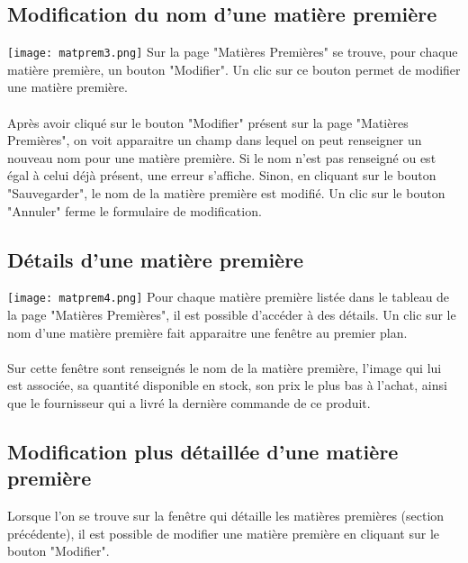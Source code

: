 \subsection{Modification du nom d'une matière première}
\texttt{[image: matprem3.png]}
Sur la page "Matières Premières" se trouve, pour chaque matière première, 
un bouton "Modifier". Un clic sur ce bouton permet de modifier une matière 
première.

\paragraph{}
Après avoir cliqué sur le bouton "Modifier" présent sur la page "Matières 
Premières", on voit apparaitre un champ dans lequel on peut renseigner un 
nouveau nom pour une matière première. Si le nom n'est pas renseigné ou est 
égal à celui déjà présent, une erreur s'affiche. Sinon, en cliquant sur le 
bouton "Sauvegarder", le nom de la matière première est modifié. Un clic sur 
le bouton "Annuler" ferme le formulaire de modification.


\subsection{Détails d'une matière première}
\texttt{[image: matprem4.png]}
Pour chaque matière première listée dans le tableau de la page "Matières 
Premières", il est possible d'accéder à des détails. Un clic sur le nom d'une 
matière première fait apparaitre une fenêtre au premier plan.

\paragraph{}
Sur cette fenêtre sont renseignés le nom de la matière première, l'image qui lui 
est associée, sa quantité disponible en stock, son prix le plus bas à l'achat, 
ainsi que le fournisseur qui a livré la dernière commande de ce produit.

\subsection{Modification plus détaillée d'une matière première}
Lorsque l'on se trouve sur la fenêtre qui détaille les matières premières
(section précédente), il est possible de modifier une matière première en 
cliquant sur le bouton "Modifier".

